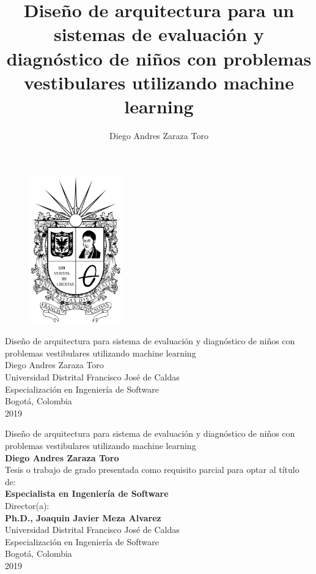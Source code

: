 \documentclass [12pt,letterpaper,oneside]{book}
\author {Diego Andres Zaraza Toro}
\title {Diseño de arquitectura para un sistemas de evaluación y diagnóstico de niños con problemas vestibulares utilizando machine learning}
\begin{document}
    \begin{center}
    	\thispagestyle{empty}
    	\vspace*{0cm}
        \begin{figure}
            \centering
            \includegraphics[width=4cm]{Imagenes/Figuras/00}
        \end{figure}
        \huge {Diseño de arquitectura para sistema de evaluación y diagnóstico de niños con problemas vestibulares utilizando machine learning}\\
        \large{Diego Andres Zaraza Toro}\\
        \large Universidad Distrital Francisco José de Caldas\\
        Especialización en Ingeniería de Software\\
        Bogotá, Colombia\\
        2019\\
    \end{center}
    \newpage
    \begin{center}
        \thispagestyle{empty}
        \vspace*{0cm}
        \large{Diseño de arquitectura para sistema de evaluación y diagnóstico de niños con problemas vestibulares utilizando machine learning}\\[3.5cm]
        \large\textbf{Diego Andres Zaraza Toro}\\[3.0cm]
        \small Tesis o trabajo de grado presentada como requisito parcial para optar al título de:\\
        \textbf{Especialista en Ingeniería de Software}\\[2.5cm]
        \small Director(a):\\
        \textbf{Ph.D., Joaquin Javier Meza Alvarez}\\[2.0cm]
        \large Universidad Distrital Francisco José de Caldas\\
        Especialización en Ingeniería de Software\\
        Bogotá, Colombia\\
        2019\\
    \end{center}
\end{document}
